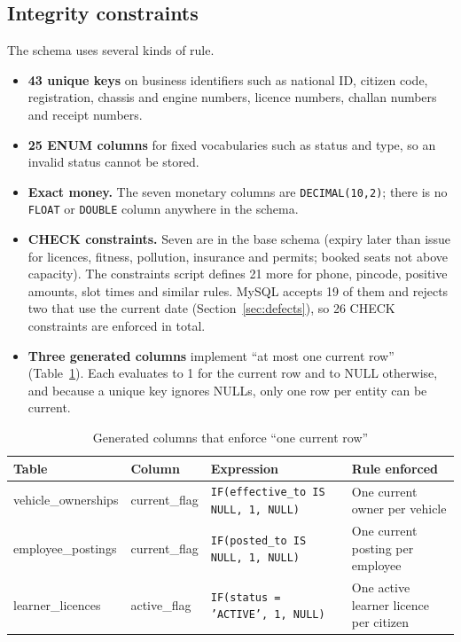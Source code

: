 \subsection{Integrity constraints}
The schema uses several kinds of rule.
\begin{itemize}
\item \textbf{43 unique keys} on business identifiers such as national ID, citizen code, registration, chassis and engine numbers, licence numbers, challan numbers and receipt numbers.
\item \textbf{25 ENUM columns} for fixed vocabularies such as status and type, so an invalid status cannot be stored.
\item \textbf{Exact money.} The seven monetary columns are \texttt{DECIMAL(10,2)}; there is no \texttt{FLOAT} or \texttt{DOUBLE} column anywhere in the schema.
\item \textbf{CHECK constraints.} Seven are in the base schema (expiry later than issue for licences, fitness, pollution, insurance and permits; booked seats not above capacity). The constraints script defines 21 more for phone, pincode, positive amounts, slot times and similar rules. MySQL accepts 19 of them and rejects two that use the current date (Section~\ref{sec:defects}), so 26 CHECK constraints are enforced in total.
\item \textbf{Three generated columns} implement ``at most one current row'' (Table~\ref{tab:gen}). Each evaluates to 1 for the current row and to NULL otherwise, and because a unique key ignores NULLs, only one row per entity can be current.
\end{itemize}

\begin{table}[H]
\centering\small
\caption{Generated columns that enforce ``one current row''}\label{tab:gen}
\begin{tabularx}{\linewidth}{@{}p{3.4cm}p{3.0cm}p{3.6cm}X@{}}
\toprule \textbf{Table} & \textbf{Column} & \textbf{Expression} & \textbf{Rule enforced}\\ \midrule
vehicle\_ownerships & current\_flag & \texttt{IF(effective\_to IS NULL, 1, NULL)} & One current owner per vehicle\\
employee\_postings & current\_flag & \texttt{IF(posted\_to IS NULL, 1, NULL)} & One current posting per employee\\
learner\_licences & active\_flag & \texttt{IF(status = 'ACTIVE', 1, NULL)} & One active learner licence per citizen\\
\bottomrule
\end{tabularx}
\end{table}

